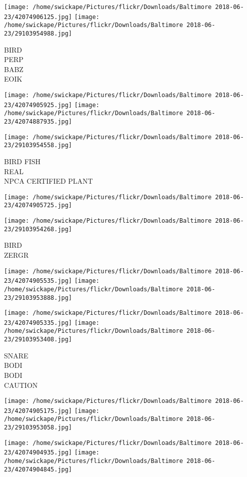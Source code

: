 \documentclass[10pt,letterpaper]{article}
\begin{document}
\texttt{[image: /home/swickape/Pictures/flickr/Downloads/Baltimore 2018-06-23/42074906125.jpg]}
\texttt{[image: /home/swickape/Pictures/flickr/Downloads/Baltimore 2018-06-23/29103954988.jpg]}

BIRD\\
PERP\\
BABZ\\
EOIK
\pagebreak

\texttt{[image: /home/swickape/Pictures/flickr/Downloads/Baltimore 2018-06-23/42074905925.jpg]}
\texttt{[image: /home/swickape/Pictures/flickr/Downloads/Baltimore 2018-06-23/42074887935.jpg]}

\texttt{[image: /home/swickape/Pictures/flickr/Downloads/Baltimore 2018-06-23/29103954558.jpg]}

BIRD FISH\\
REAL\\
NPCA CERTIFIED PLANT
\pagebreak

\texttt{[image: /home/swickape/Pictures/flickr/Downloads/Baltimore 2018-06-23/42074905725.jpg]}

\vspace{0.25in}
\texttt{[image: /home/swickape/Pictures/flickr/Downloads/Baltimore 2018-06-23/29103954268.jpg]}

BIRD\\
ZERGR
\pagebreak

\texttt{[image: /home/swickape/Pictures/flickr/Downloads/Baltimore 2018-06-23/42074905535.jpg]}
\texttt{[image: /home/swickape/Pictures/flickr/Downloads/Baltimore 2018-06-23/29103953888.jpg]}

\texttt{[image: /home/swickape/Pictures/flickr/Downloads/Baltimore 2018-06-23/42074905335.jpg]}
\texttt{[image: /home/swickape/Pictures/flickr/Downloads/Baltimore 2018-06-23/29103953408.jpg]}

SNARE\\
BODI\\
BODI\\
CAUTION
\pagebreak

\texttt{[image: /home/swickape/Pictures/flickr/Downloads/Baltimore 2018-06-23/42074905175.jpg]}
\texttt{[image: /home/swickape/Pictures/flickr/Downloads/Baltimore 2018-06-23/29103953058.jpg]}

\texttt{[image: /home/swickape/Pictures/flickr/Downloads/Baltimore 2018-06-23/42074904935.jpg]}
\texttt{[image: /home/swickape/Pictures/flickr/Downloads/Baltimore 2018-06-23/42074904845.jpg]}
\end{document}
